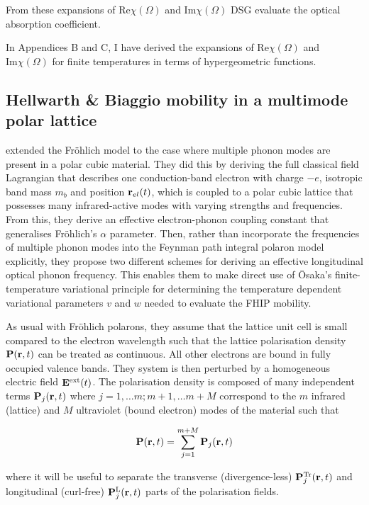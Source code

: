 From these expansions of $\text{Re}\chi(\Omega)$ and $\text{Im}\chi(\Omega)$ DSG evaluate the optical absorption coefficient. 

In Appendices B and C, I have derived the expansions of $\text{Re}\chi(\Omega)$ and $\text{Im}\chi(\Omega)$ for finite temperatures in terms of hypergeometric functions.

\subsection{Hellwarth \& Biaggio mobility in a multimode polar lattice}

\cite{hellwarth_mobility_1999} extended the Fr\"ohlich model to the case where multiple phonon modes are present in a polar cubic material. They did this by deriving the full classical field Lagrangian that describes one conduction-band electron with charge $-e$, isotropic band mass $m_b$ and position $\vb{r}_{el}(t)$, which is coupled to a polar cubic lattice that possesses many infrared-active modes with varying strengths and frequencies. From this, they derive an effective electron-phonon coupling constant that generalises Fr\"ohlich's $\alpha$ parameter. Then, rather than incorporate the frequencies of multiple phonon modes into the Feynman path integral polaron model explicitly, they propose two different schemes for deriving an effective longitudinal optical phonon frequency. This enables them to make direct use of \=Osaka's finite-temperature variational principle for determining the temperature dependent variational parameters $v$ and $w$ needed to evaluate the FHIP mobility. 

As usual with Fr\"ohlich polarons, they assume that the lattice unit cell is small compared to the electron wavelength such that the lattice polarisation density $\vb{P}(\vb{r}, t)$ can be treated as continuous. All other electrons are bound in fully occupied valence bands. They system is then perturbed by a homogeneous electric field $\vb{E}^{\text{ext}}(t)$. The polarisation density is composed of many independent terms $\vb{P}_j(\vb{r}, t)$ where $j = 1, \dots m ; m + 1, \dots m + M$ correspond to the $m$ infrared (lattice) and $M$ ultraviolet (bound electron) modes of the material such that

\begin{equation}
    \vb{P}(\vb{r}, t) = \sum_{j = 1}^{m + M} \vb{P}_j(\vb{r}, t)
\end{equation}

where it will be useful to separate the transverse (divergence-less) $\vb{P}_j^{\text{Tr}}(\vb{r}, t)$ and longitudinal (curl-free) $\vb{P}_j^{\text{L}}(\vb{r}, t)$ parts of the polarisation fields.

